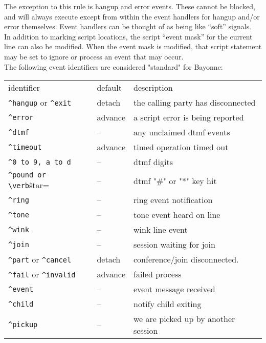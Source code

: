 \documentclass[a4paper,12pt]{article}
\begin{document}
The exception to this rule is hangup and error events.  These cannot be
blocked, and will always execute except from within the event handlers
for hangup and/or error themselves.  Event handlers can be thought of
as being like ``soft'' signals. \\

In addition to marking script locations, the script ``event mask'' for
the current line can also be modified.  When the event mask is modified,
that script statement may be set to ignore or process an event that may
occur. \\

The following event identifiers are considered "standard" for Bayonne: 

\begin{center}
\begin{supertabular}{|l|l|l|}
identifier                      & default       & description \\
\verb=^hangup= or \verb=^exit=  & detach        & the calling party has disconnected \\
\verb=^error=                   & advance       & a script error is being reported \\
\verb=^dtmf=                    & \---          & any unclaimed dtmf events \\
\verb=^timeout=                 & advance       & timed operation timed out \\
\verb=^0 to 9, a to d=          & \---          & dtmf digits \\
\verb=^pound or \verb=\^star=   & \---          & dtmf "\#" or "*" key hit \\
\verb=^ring=			& \---		& ring event notification \\
\verb=^tone=                    & \---          & tone event heard on line \\
\verb=^wink=                    & \---          & wink line event \\
\verb=^join=			& \---		& session waiting for join \\
\verb=^part= or \verb=^cancel=  & detach        & conference/join disconnected. \\
\verb=^fail= or \verb=^invalid= & advance       & failed process \\
\verb=^event=                   & \---          & event message received \\
\verb=^child=                   & \---          & notify child exiting \\
\verb=^pickup=                  & \---          & we are picked up by another session \\
\end{supertabular}
\end{center}
\end{document}
